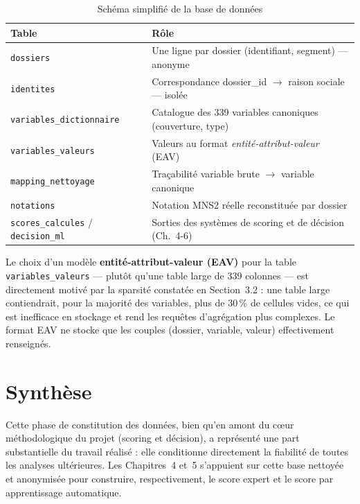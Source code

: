 \begin{table}[h]
\centering
\small
\begin{tabular}{@{}p{3.2cm}p{9.5cm}@{}}
\toprule
\textbf{Table} & \textbf{Rôle} \\
\midrule
\texttt{dossiers} & Une ligne par dossier (identifiant, segment) — anonyme \\
\texttt{identites} & Correspondance dossier\_id $\rightarrow$ raison sociale — isolée \\
\texttt{variables\_dictionnaire} & Catalogue des 339 variables canoniques (couverture, type) \\
\texttt{variables\_valeurs} & Valeurs au format \emph{entité-attribut-valeur} (EAV) \\
\texttt{mapping\_nettoyage} & Traçabilité variable brute $\rightarrow$ variable canonique \\
\texttt{notations} & Notation MNS2 réelle reconstituée par dossier \\
\texttt{scores\_calcules} / \texttt{decision\_ml} & Sorties des systèmes de scoring et de décision (Ch.~4-6) \\
\bottomrule
\end{tabular}
\caption{Schéma simplifié de la base de données}
\label{tab:schema-bdd}
\end{table}

Le choix d'un modèle \textbf{entité-attribut-valeur (EAV)} pour la table
\texttt{variables\_valeurs} — plutôt qu'une table large de 339 colonnes — est directement motivé
par la sparsité constatée en Section~3.2 : une table large contiendrait, pour la majorité des
variables, plus de 30\,\% de cellules vides, ce qui est inefficace en stockage et rend les
requêtes d'agrégation plus complexes. Le format EAV ne stocke que les couples
(dossier, variable, valeur) effectivement renseignés.

\section{Synthèse}

Cette phase de constitution des données, bien qu'en amont du cœur méthodologique du projet
(scoring et décision), a représenté une part substantielle du travail réalisé : elle conditionne
directement la fiabilité de toutes les analyses ultérieures. Les Chapitres~4 et~5 s'appuient sur
cette base nettoyée et anonymisée pour construire, respectivement, le score expert et le score
par apprentissage automatique.
